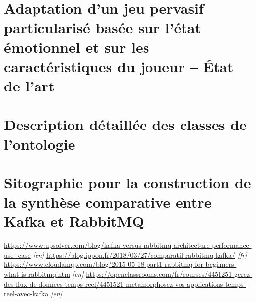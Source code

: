\documentclass{article}
\begin{document}
\newpage
\appendix
\section{Adaptation d’un jeu pervasif particularisé basée sur l'état émotionnel et sur les caractéristiques du joueur – État de l’art}\label{ann:eda}
	

\section{Description détaillée des classes de l'ontologie}\label{ann:detailclasses}
	

\section{Sitographie pour la construction de la synthèse comparative entre Kafka et RabbitMQ}\label{ann:kafkarabbitmq}
	\hspace*{-0.5cm}\href{https://www.upsolver.com/blog/kafka-versus-rabbitmq-architecture-performance-use-
	case}{https://www.upsolver.com/blog/kafka-versus-rabbitmq-architecture-performance-use-
	case} \textit{[en]} \medskip\newline
	\href{https://blog.ippon.fr/2018/03/27/comparatif-rabbitmq-kafka/}{https://blog.ippon.fr/2018/03/27/comparatif-rabbitmq-kafka/} \textit{[fr]}\medskip\newline
	\href{https://www.cloudamqp.com/blog/2015-05-18-part1-rabbitmq-for-beginners-what-is-rabbitmq.htm}{https://www.cloudamqp.com/blog/2015-05-18-part1-rabbitmq-for-beginners-what-is-rabbitmq.htm} \textit{[en]}\medskip\newline
	\href{https://openclassrooms.com/fr/courses/4451251-gerez-des-flux-de-donnees-temps-reel/4451521-metamorphosez-vos-applications-temps-reel-avec-kafka}{https://openclassrooms.com/fr/courses/4451251-gerez-des-flux-de-donnees-temps-reel/4451521-metamorphosez-vos-applications-temps-reel-avec-kafka} \textit{[en]}
\end{document}
